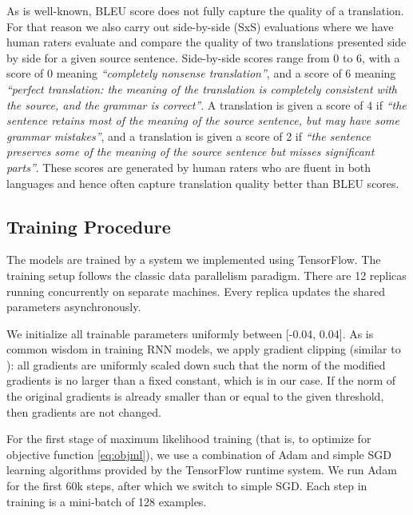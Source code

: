 As is well-known, BLEU score does not fully capture the quality of a
translation. For that reason we also carry out side-by-side (SxS)
evaluations where we have human raters evaluate and compare the
quality of two translations presented side by side for a given source
sentence. Side-by-side scores range from 0 to 6, with a score of 0
meaning \textsl{``completely nonsense translation''}, and a score of 6
meaning \textsl{``perfect translation: the meaning of the translation
is completely consistent with the source, and the grammar is
correct''}. A translation is given a score of 4 if \textsl{``the
sentence retains most of the meaning of the source sentence, but may
have some grammar mistakes''}, and a translation is given a score of 2
if \textsl{``the sentence preserves some of the meaning of the source
sentence but misses significant parts''}. These scores are generated
by human raters who are fluent in both languages and hence often
capture translation quality better than BLEU scores.





\subsection{Training Procedure}
The models are trained by a system we implemented using
TensorFlow\cite{tensorflow16}.
The training setup follows the classic
data parallelism paradigm. There are 12 replicas running
concurrently on separate machines. Every replica updates the shared
parameters asynchronously.

We initialize all trainable parameters uniformly between [-0.04, 0.04]. As
is common wisdom in training RNN models, we apply gradient clipping
(similar to \cite{sutskever2014sequence}): all gradients are uniformly
scaled down such that the norm of the modified gradients is no larger
than a fixed constant, which is  in our case. If the norm of the
original gradients is already smaller than or equal to the given
threshold, then gradients are not changed.

For the first stage of maximum likelihood training (that is, to
optimize for objective function \ref{eq:objml}), we use a
combination of Adam \cite{DBLP:journals/corr/KingmaB14} and simple SGD
learning algorithms provided by the TensorFlow runtime system.  We run Adam for
the first 60k steps, after which we switch to simple SGD. Each step in
training is a mini-batch of 128 examples. 

